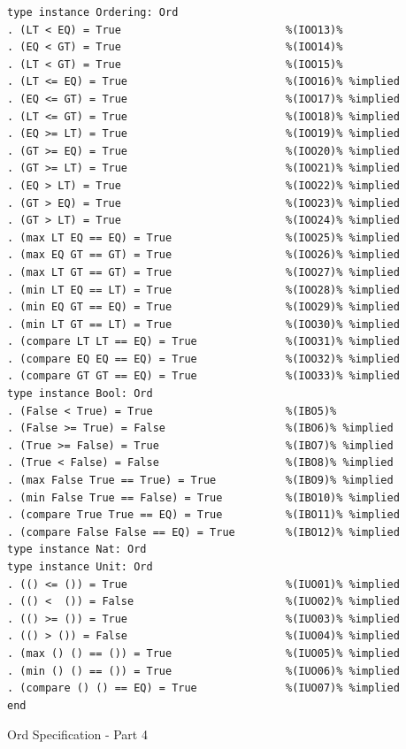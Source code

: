 \documentclass[12pt,twoside]{article}
\numberwithin{spec}{subsection}
\numberwithin{proof}{subsection}
\numberwithin{figure}{subsection}
\numberwithin{code}{subsection}
\begin{document}
\addtocounter{spec}{-1}
\begin{spec}
\begin{verbatim}
type instance Ordering: Ord
. (LT < EQ) = True                          %(IOO13)%
. (EQ < GT) = True                          %(IOO14)%
. (LT < GT) = True                          %(IOO15)%
. (LT <= EQ) = True                         %(IOO16)% %implied
. (EQ <= GT) = True                         %(IOO17)% %implied
. (LT <= GT) = True                         %(IOO18)% %implied
. (EQ >= LT) = True                         %(IOO19)% %implied
. (GT >= EQ) = True                         %(IOO20)% %implied
. (GT >= LT) = True                         %(IOO21)% %implied
. (EQ > LT) = True                          %(IOO22)% %implied
. (GT > EQ) = True                          %(IOO23)% %implied
. (GT > LT) = True                          %(IOO24)% %implied
. (max LT EQ == EQ) = True                  %(IOO25)% %implied
. (max EQ GT == GT) = True                  %(IOO26)% %implied
. (max LT GT == GT) = True                  %(IOO27)% %implied
. (min LT EQ == LT) = True                  %(IOO28)% %implied
. (min EQ GT == EQ) = True                  %(IOO29)% %implied
. (min LT GT == LT) = True                  %(IOO30)% %implied
. (compare LT LT == EQ) = True              %(IOO31)% %implied
. (compare EQ EQ == EQ) = True              %(IOO32)% %implied
. (compare GT GT == EQ) = True              %(IOO33)% %implied
type instance Bool: Ord
. (False < True) = True                     %(IBO5)%
. (False >= True) = False                   %(IBO6)% %implied
. (True >= False) = True                    %(IBO7)% %implied
. (True < False) = False                    %(IBO8)% %implied
. (max False True == True) = True           %(IBO9)% %implied
. (min False True == False) = True          %(IBO10)% %implied
. (compare True True == EQ) = True          %(IBO11)% %implied
. (compare False False == EQ) = True        %(IBO12)% %implied
type instance Nat: Ord
type instance Unit: Ord
. (() <= ()) = True                         %(IUO01)% %implied
. (() <  ()) = False                        %(IUO02)% %implied
. (() >= ()) = True                         %(IUO03)% %implied
. (() > ()) = False                         %(IUO04)% %implied
. (max () () == ()) = True                  %(IUO05)% %implied
. (min () () == ()) = True                  %(IUO06)% %implied
. (compare () () == EQ) = True              %(IUO07)% %implied
end
\end{verbatim}
\caption{Ord Specification - Part 4}
\end{spec}
\end{document}
